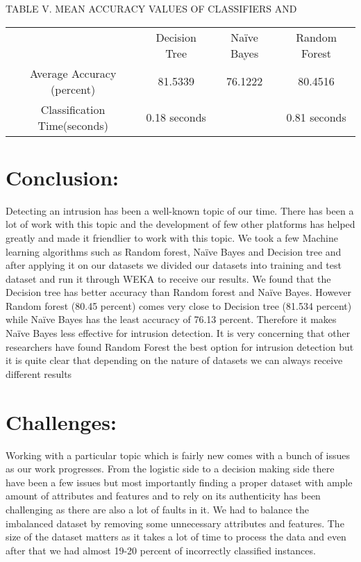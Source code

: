 \documentclass[conference]{IEEEtran}
\begin{document}
TABLE V. MEAN ACCURACY VALUES OF CLASSIFIERS AND
      
\begin{center}
\begin{tabular}{ |c|c|c|c| } 
 \hline
 & Decision
Tree & Naïve Bayes & Random Forest \\ 
 Average Accuracy (percent) & 81.5339           &   76.1222       &  80.4516  \\ 
Classification Time(seconds) &   0.18 seconds         &             &  0.81 seconds   \\ 
 \hline
\end{tabular}
\end{center}       
      


    




\section{Conclusion: }

Detecting an intrusion has been a well-known topic of our time. There has been a lot of work with this topic and the development of few other platforms has helped greatly and made it friendlier to work with this topic. We took a few Machine learning algorithms such as Random forest, Naïve Bayes and Decision tree and after applying it on our datasets we divided our datasets into training and test dataset and run it through WEKA to receive our results. We found that the Decision tree has better accuracy than Random forest and Naïve Bayes. However Random forest (80.45 percent) comes very close to Decision tree (81.534 percent) while Naïve Bayes has the least accuracy of 76.13 percent. Therefore it makes Naïve Bayes less effective for intrusion detection. It is very concerning that other researchers have found Random Forest the best option for intrusion detection but it is quite clear that depending on the nature of datasets we can always receive different results
\\
\section{Challenges:  }
Working with a particular topic which is fairly new comes with a bunch of issues as our work progresses. From the logistic side to a decision making side there have been a few issues but most importantly finding a proper dataset with ample amount of attributes and features and to rely on its authenticity has been challenging as there are also a lot of faults in it. We had to balance the imbalanced dataset by removing some unnecessary attributes and features. The size of the dataset matters as it takes a lot of time to process the data and even after that we had almost 19-20 percent of incorrectly classified instances.
\end{document}

